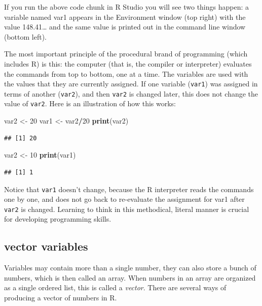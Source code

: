 \documentclass[
]{book}
\newenvironment{Shaded}{\begin{snugshade}}{\end{snugshade}}
\newcommand{\DecValTok}[1]{\textcolor[rgb]{0.00,0.00,0.81}{#1}}
\newcommand{\KeywordTok}[1]{\textcolor[rgb]{0.13,0.29,0.53}{\textbf{#1}}}
\newcommand{\NormalTok}[1]{#1}
\newcommand{\OperatorTok}[1]{\textcolor[rgb]{0.81,0.36,0.00}{\textbf{#1}}}
\newcommand{\StringTok}[1]{\textcolor[rgb]{0.31,0.60,0.02}{#1}}
\theoremstyle{definition}
\theoremstyle{definition}
\theoremstyle{definition}
\theoremstyle{remark}
\begin{document}
If you run the above code chunk in R Studio you will see two things happen: a variable named var1 appears in the Environment window (top right) with the value 148.41\ldots{} and the same value is printed out in the command line window (bottom left).

The most important principle of the procedural brand of programming (which includes R) is this: the computer (that is, the compiler or interpreter) evaluates the commands from top to bottom, one at a time. The variables are used with the values that they are currently assigned. If one variable (\texttt{var1}) was assigned in terms of another (\texttt{var2}), and then \texttt{var2} is changed later, this does not change the value of \texttt{var2}. Here is an illustration of how this works:

\begin{Shaded}
\begin{Highlighting}[]
\NormalTok{var2 \textless{}{-}}\StringTok{ }\DecValTok{20}
\NormalTok{var1 \textless{}{-}}\StringTok{ }\NormalTok{var2}\OperatorTok{/}\DecValTok{20}
\KeywordTok{print}\NormalTok{(var2)}
\end{Highlighting}
\end{Shaded}

\begin{verbatim}
## [1] 20
\end{verbatim}

\begin{Shaded}
\begin{Highlighting}[]
\NormalTok{var2 \textless{}{-}}\StringTok{ }\DecValTok{10}
\KeywordTok{print}\NormalTok{(var1)}
\end{Highlighting}
\end{Shaded}

\begin{verbatim}
## [1] 1
\end{verbatim}

Notice that \texttt{var1} doesn't change, because the R interpreter reads the commands one by one, and does not go back to re-evaluate the assignment for var1 after \texttt{var2} is changed. Learning to think in this methodical, literal manner is crucial for developing programming skills.

\hypertarget{vector-variables}{%
\subsection{vector variables}\label{vector-variables}}

Variables may contain more than a single number, they can also store a bunch of numbers, which is then called an array. When numbers in an array are organized as a single ordered list, this is called a  \emph{vector}. There are several ways of producing a vector of numbers in R.
\end{document}
